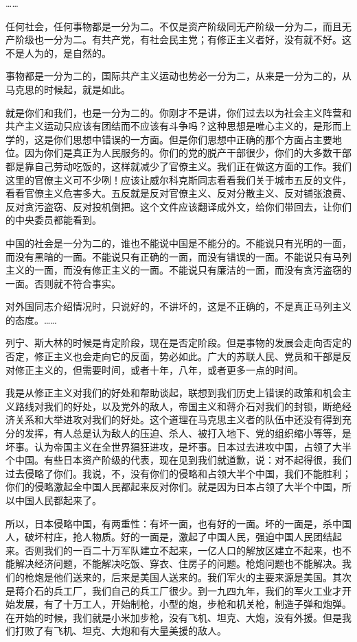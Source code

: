 ……

任何社会，任何事物都是一分为二。不仅是资产阶级同无产阶级一分为二，而且无产阶级也一分为二。有共产党，有社会民主党；有修正主义者好，没有就不好。这不是人为的，是自然的。

事物都是一分为二的，国际共产主义运动也势必一分为二，从来是一分为二的，从马克思的时候起，就是如此。

就是你们和我们，也是一分为二的。你刚才不是讲，你们过去以为社会主义阵营和共产主义运动只应该有团结而不应该有斗争吗？这种思想是唯心主义的，是形而上学的，这是你们思想中错误的一方面。但是你们思想中正确的那个方面占主要地位。因为你们是真正为人民服务的。你们的党的脱产干部很少，你们的大多数干部都是靠自己劳动吃饭的，这样就减少了官僚主义。我们正在做这方面的工作。我们这里的官僚主义可不少咧！应该让威尔科克斯同志看看我们关于城市五反的文件，看看官僚主义危害多大。五反就是反对官僚主义、反对分散主义、反对铺张浪费、反对贪污盗窃、反对投机倒把。这个文件应该翻译成外文，给你们带回去，让你们的中央委员都能看到。

中国的社会是一分为二的，谁也不能说中国是不能分的。不能说只有光明的一面，而没有黑暗的一面。不能说只有正确的一面，而没有错误的一面。不能说只有马列主义的一面，而没有修正主义的一面。不能说只有廉洁的一面，而没有贪污盗窃的一面。否则就不符合事实。

对外国同志介绍情况时，只说好的，不讲坏的，这是不正确的，不是真正马列主义的态度。……

列宁、斯大林的时候是肯定阶段，现在是否定阶段。但是事物的发展会走向否定的否定，修正主义也会走向它的反面，势必如此。广大的苏联人民、党员和干部是反对修正主义的，但需要时间，或者十年，八年，或者更多一点的时间。

我是从修正主义对我们的好处和帮助谈起，联想到我们历史上错误的政策和机会主义路线对我们的好处，以及党外的敌人，帝国主义和蒋介石对我们的封锁，断绝经济关系和大举进攻对我们的好处。这个道理在马克思主义者的队伍中还没有得到充分的发挥，有人总是认为敌人的压迫、杀人、被打入地下、党的组织缩小等等，是坏事。认为帝国主义在全世界猖狂进攻，是坏事。日本过去进攻中国，占领了大半个中国。有些日本资产阶级的代表，现在见到我们就道歉，说：对不起得很，我们过去侵略了你们。我说，不，没有你们的侵略和占领大半个中国，我们不能胜利；你们的侵略激起全中国人民都起来反对你们。就是因为日本占领了大半个中国，所以中国人民都起来了。

所以，日本侵略中国，有两重性：有坏一面，也有好的一面。坏的一面是，杀中国人，破坏村庄，抢人物质。好的一面是，激起了中国人民，强迫中国人民团结起来。否则我们的一百二十万军队建立不起来，一亿人口的解放区建立不起来，也不能解决经济问题，不能解决吃饭、穿衣、住房子的问题。枪炮问题也不能解决。我们的枪炮是他们送来的，后来是美国人送来的。我们军火的主要来源是美国。其次是蒋介石的兵工厂，我们自己的兵工厂很少。到一九四九年，我们的军火工业才开始发展，有了十万工人，开始制枪，小型的炮，步枪和机关枪，制造子弹和炮弹。在开始的时候，我们就是小米加步枪，没有飞机、坦克、大炮，没有外援。但是我们打败了有飞机、坦克、大炮和有大量美援的敌人。


